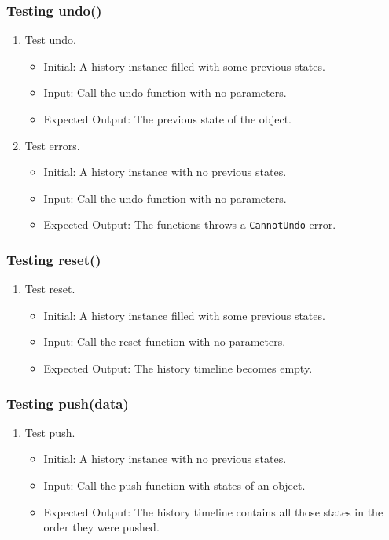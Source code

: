 \documentclass[12pt, titlepage]{article}
\begin{document}
\subsubsection {Testing undo()}
\begin{enumerate}
	\item Test undo. \begin{itemize}
		      \item Initial: A history instance filled with some previous states.
		      \item Input: Call the undo function with no parameters.
		      \item Expected Output: The previous state of the object.
	      \end{itemize}
	\item Test errors. \begin{itemize}
		      \item Initial: A history instance with no previous states.
		      \item Input: Call the undo function with no parameters.
		      \item Expected Output: The functions throws a \texttt{CannotUndo} error.
	      \end{itemize}
\end{enumerate}

\subsubsection {Testing reset()}
\begin{enumerate}
	\item Test reset. \begin{itemize}
		      \item Initial: A history instance filled with some previous states.
		      \item Input: Call the reset function with no parameters.
		      \item Expected Output: The history timeline becomes empty.
	      \end{itemize}
\end{enumerate}

\subsubsection {Testing push(data)}
\begin{enumerate}
	\item Test push. \begin{itemize}
		      \item Initial: A history instance with no previous states.
		      \item Input: Call the push function with states of an object.
		      \item Expected Output: The history timeline contains all those states in the order they were pushed.
	      \end{itemize}
\end{enumerate}
\end{document}
